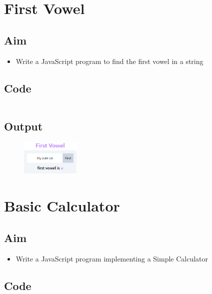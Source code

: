 \documentclass{article}
\begin{document}
\section{First Vowel}
\subsection{Aim}
\begin{itemize}
	\item Write a JavaScript program to find the first vowel in a string
\end{itemize}

\subsection{Code}
\inputminted[frame=lines, breaklines, breakanywhere, numberblanklines=false]{html}{./prog_12/index.html}

\subsection{Output}
\begin{figure}[h!]
	\centering
	\includegraphics[width=0.25\textwidth]{./Assets/p12.png}
\end{figure}
\newpage

\section{Basic Calculator}
\subsection{Aim}
\begin{itemize}
	\item Write a JavaScript program implementing a Simple Calculator
\end{itemize}

\subsection{Code}
\inputminted[frame=lines, breaklines, breakanywhere, numberblanklines=false]{html}{./prog_13/index.html}

\newpage
\end{document}
